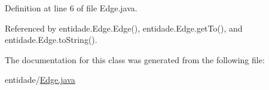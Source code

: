 Definition at line 6 of file Edge.\+java.



Referenced by entidade.\+Edge.\+Edge(), entidade.\+Edge.\+get\+To(), and entidade.\+Edge.\+to\+String().



The documentation for this class was generated from the following file\+:\begin{DoxyCompactItemize}
\item 
entidade/\hyperlink{Edge_8java}{Edge.\+java}\end{DoxyCompactItemize}
